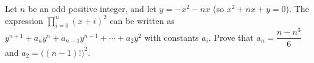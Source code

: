 Let $n$ be an odd positive integer, and let $y=-x^2-nx$ (so $x^2+nx+y=0$). The expression $\displaystyle\prod_{i=0}^{n}(x+i)^2$ can be written as $y^{n+1}+a_ny^n+a_{n-1}y^{n-1}+\cdots+a_2y^2$ with constants $a_i$. Prove that $a_n=\dfrac{n-n^3}{6}$ and $a_2=\bigl((n-1)!\bigr)^2$.
